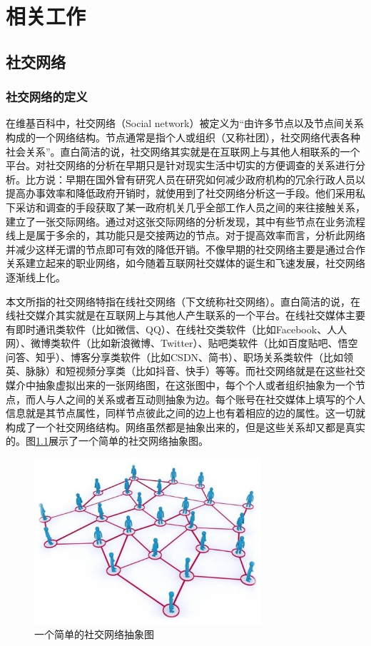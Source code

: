 \chapter{相关工作}
\section{社交网络}
\subsection{社交网络的定义}
在维基百科中，社交网络（Social network）被定义为“由许多节点以及节点间关系构成的一个网络结构。节点通常是指个人或组织（又称社团），社交网络代表各种社会关系”。直白简洁的说，社交网络其实就是在互联网上与其他人相联系的一个平台。对社交网络的分析在早期只是针对现实生活中切实的方便调查的关系进行分析。比方说：早期在国外曾有研究人员在研究如何减少政府机构的冗余行政人员以提高办事效率和降低政府开销时，就使用到了社交网络分析这一手段。他们采用私下采访和调查的手段获取了某一政府机关几乎全部工作人员之间的来往接触关系，建立了一张交际网络。通过对这张交际网络的分析发现，其中有些节点在业务流程线上是属于多余的，其功能只是交接两边的节点。对于提高效率而言，分析此网络并减少这样无谓的节点即可有效的降低开销。不像早期的社交网络主要是通过合作关系建立起来的职业网络，如今随着互联网社交媒体的诞生和飞速发展，社交网络逐渐线上化。

本文所指的社交网络特指在线社交网络（下文统称社交网络）。直白简洁的说，在线社交媒介其实就是在互联网上与其他人产生联系的一个平台。在线社交媒体主要有即时通讯类软件（比如微信、QQ）、在线社交类软件（比如Facebook、人人网）、微博类软件（比如新浪微博、Twitter）、贴吧类软件（比如百度贴吧、悟空问答、知乎）、博客分享类软件（比如CSDN、简书）、职场关系类软件（比如领英、脉脉）和短视频分享类（比如抖音、快手）等等。而社交网络就是在这些社交媒介中抽象虚拟出来的一张网络图，在这张图中，每个个人或者组织抽象为一个节点，而人与人之间的关系或者互动则抽象为边。每个账号在社交媒体上填写的个人信息就是其节点属性，同样节点彼此之间的边上也有着相应的边的属性。这一切就构成了一个社交网络结构。网络虽然都是抽象出来的，但是这些关系却又都是真实的。图\ref{fig:fig2-0}展示了一个简单的社交网络抽象图。

\begin{figure}
  \centering
  \includegraphics[width=0.75\textwidth]{figures/fig2-0}
  \caption{一个简单的社交网络抽象图}\label{fig:fig2-0}
\end{figure}

